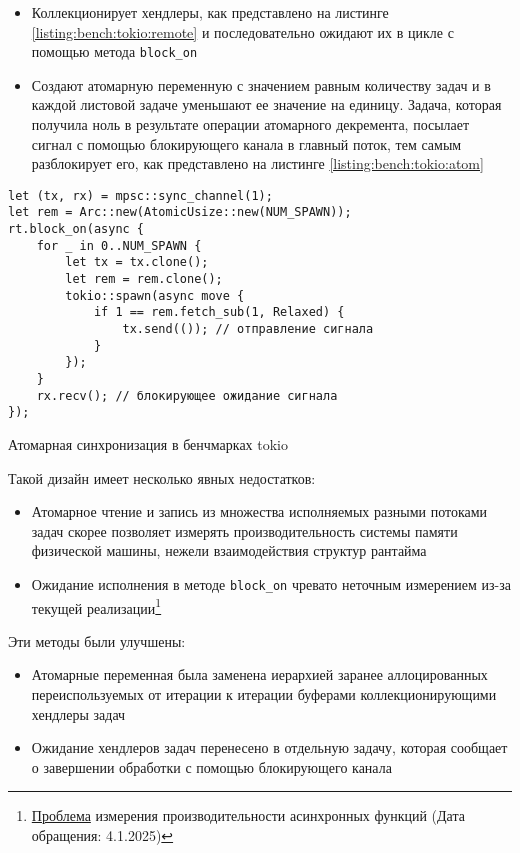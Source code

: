 \begin{itemize}
    \item Коллекционирует хендлеры, как представлено на листинге \ref{listing:bench:tokio:remote} и последовательно ожидают их в цикле с помощью метода \verb|block_on|
    \item Создают атомарную переменную с значением равным количеству задач и в каждой листовой задаче уменьшают ее значение на единицу. Задача, которая получила ноль в результате операции атомарного декремента, посылает сигнал с помощью блокирующего канала в главный поток, тем самым разблокирует его, как представлено на листинге \ref{listing:bench:tokio:atom}
\end{itemize}

\begin{listing}[H]
    \begin{verbatim}
let (tx, rx) = mpsc::sync_channel(1);
let rem = Arc::new(AtomicUsize::new(NUM_SPAWN));
rt.block_on(async {
    for _ in 0..NUM_SPAWN {
        let tx = tx.clone();
        let rem = rem.clone();
        tokio::spawn(async move {
            if 1 == rem.fetch_sub(1, Relaxed) {
                tx.send(()); // отправление сигнала
            }
        });
    }
    rx.recv(); // блокирующее ожидание сигнала
});
    \end{verbatim}

    \caption{Атомарная синхронизация в бенчмарках tokio}
    \label{listing:bench:tokio:atom}
\end{listing}

Такой дизайн имеет несколько явных недостатков:

\begin{itemize}
    \item Атомарное чтение и запись из множества исполняемых разными потоками задач скорее позволяет измерять производительность системы памяти физической машины, нежели взаимодействия структур рантайма
    \item Ожидание исполнения в методе \verb|block_on| чревато неточным измерением из-за текущей реализации\footnote{\href{https://github.com/bheisler/criterion.rs/issues/819}{Проблема} измерения производительности асинхронных функций (Дата обращения: 4.1.2025)}
\end{itemize}

Эти методы были улучшены:

\begin{itemize}
    \item Атомарные переменная была заменена иерархией заранее аллоцированных переиспользуемых от итерации к итерации буферами коллекционирующими хендлеры задач
    \item Ожидание хендлеров задач перенесено в отдельную задачу, которая сообщает о завершении обработки с помощью блокирующего канала
\end{itemize}


